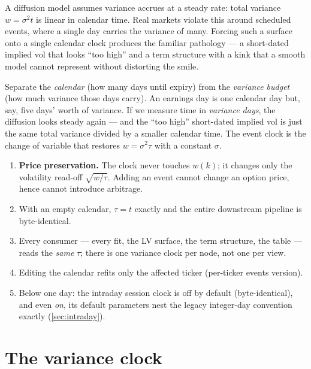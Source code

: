 \documentclass[11pt]{article}
\begin{document}
A diffusion model assumes variance accrues at a steady rate: total variance
$w=\sigma^2 t$ is linear in calendar time. Real markets violate this around
scheduled events, where a single day carries the variance of many. Forcing such a
surface onto a single calendar clock produces the familiar pathology --- a
short-dated implied vol that looks ``too high'' and a term structure with a kink
that a smooth model cannot represent without distorting the smile.

\begin{heuristic}
Separate the \emph{calendar} (how many days until expiry) from the \emph{variance
budget} (how much variance those days carry). An earnings day is one calendar day
but, say, five days' worth of variance. If we measure time in \emph{variance days},
the diffusion looks steady again --- and the ``too high'' short-dated implied vol
is just the same total variance divided by a smaller calendar time. The event
clock is the change of variable that restores $w=\sigma^2\tau$ with a constant
$\sigma$.
\end{heuristic}

\begin{invariant}
\begin{enumerate}[leftmargin=1.6em]
\item \textbf{Price preservation.} The clock never touches $w(k)$; it changes
only the volatility read-off $\sqrt{w/\tau}$. Adding an event cannot change an
option price, hence cannot introduce arbitrage.
\item With an empty calendar, $\tau=t$ exactly and the entire downstream
pipeline is byte-identical.
\item Every consumer --- every fit, the LV surface, the term structure, the
table --- reads the \emph{same} $\tau$; there is one variance clock per node,
not one per view.
\item Editing the calendar refits only the affected ticker (per-ticker events
version).
\item Below one day: the intraday session clock is off by default
(byte-identical), and even \emph{on}, its default parameters nest the
legacy integer-day convention exactly (\cref{sec:intraday}).
\end{enumerate}
\end{invariant}

\section{The variance clock}
\label{sec:clock}
\end{document}
